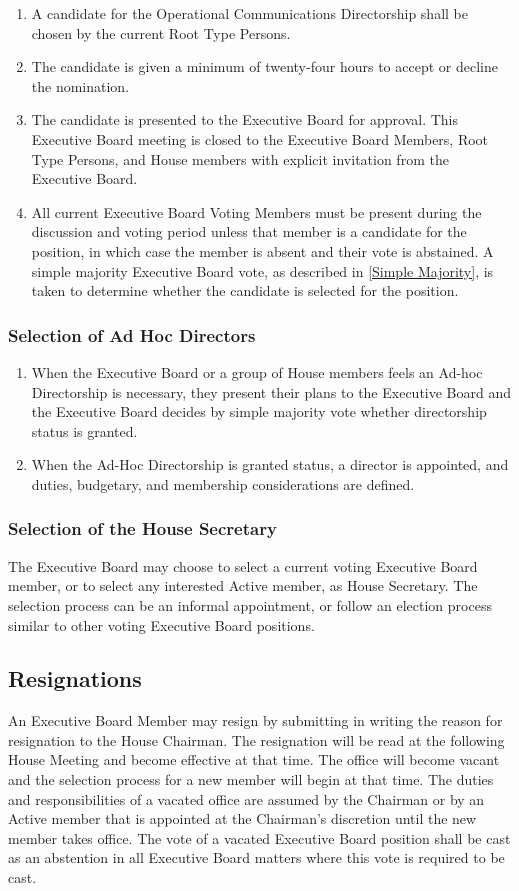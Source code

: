 \documentclass{article}
\newcommand{\asection}[1]{\subsection{#1} \label{#1}}
\newcommand{\asubsection}[1]{\subsubsection{#1} \label{#1}}
\begin{document}
\begin{enumerate}
	\item A candidate for the Operational Communications Directorship shall be chosen by the current Root Type Persons.
	\item The candidate is given a minimum of twenty-four hours to accept or decline the nomination.
	\item The candidate is presented to the Executive Board for approval.
		This Executive Board meeting is closed to the Executive Board Members, Root Type Persons, and House members with explicit invitation from the Executive Board.
	\item All current Executive Board Voting Members must be present during the discussion and voting period unless that member is a candidate for the position, in which case the member is absent and their vote is abstained.
		A simple majority Executive Board vote, as described in \ref{Simple Majority}, is taken to determine whether the candidate is selected for the position.
\end{enumerate}
\asubsection{Selection of Ad Hoc Directors}
\begin{enumerate}
	\item When the Executive Board or a group of House members feels an Ad-hoc Directorship is necessary, they present their plans to the Executive Board and the Executive Board decides by simple majority vote whether directorship status is granted.
	\item When the Ad-Hoc Directorship is granted status, a director is appointed, and duties, budgetary, and membership considerations are defined.
\end{enumerate}
\asubsection{Selection of the House Secretary}
The Executive Board may choose to select a current voting Executive Board member, or to select any interested Active member, as House Secretary.
The selection process can be an informal appointment, or follow an election process similar to other voting Executive Board positions.

\asection{Resignations}
An Executive Board Member may resign by submitting in writing the reason for resignation to the House Chairman.
The resignation will be read at the following House Meeting and become effective at that time.
The office will become vacant and the selection process for a new member will begin at that time.
The duties and responsibilities of a vacated office are assumed by the Chairman or by an Active member that is appointed at the Chairman’s discretion until the new member takes office.
The vote of a vacated Executive Board position shall be cast as an abstention in all Executive Board matters where this vote is required to be cast.
\end{document}
